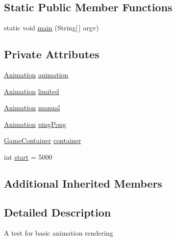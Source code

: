 \subsection*{Static Public Member Functions}
\begin{DoxyCompactItemize}
\item 
static void \mbox{\hyperlink{classorg_1_1newdawn_1_1slick_1_1tests_1_1_animation_test_a00e94fec1ac8af9337259e958e88aa74}{main}} (String\mbox{[}$\,$\mbox{]} argv)
\end{DoxyCompactItemize}
\subsection*{Private Attributes}
\begin{DoxyCompactItemize}
\item 
\mbox{\hyperlink{classorg_1_1newdawn_1_1slick_1_1_animation}{Animation}} \mbox{\hyperlink{classorg_1_1newdawn_1_1slick_1_1tests_1_1_animation_test_a1481626a35452ac4fd6b535c7a3c3afc}{animation}}
\item 
\mbox{\hyperlink{classorg_1_1newdawn_1_1slick_1_1_animation}{Animation}} \mbox{\hyperlink{classorg_1_1newdawn_1_1slick_1_1tests_1_1_animation_test_a21a680962a0736500e3a7d72caa1de4c}{limited}}
\item 
\mbox{\hyperlink{classorg_1_1newdawn_1_1slick_1_1_animation}{Animation}} \mbox{\hyperlink{classorg_1_1newdawn_1_1slick_1_1tests_1_1_animation_test_a3f8e79b4500cfad2ae6939b2fe0794b0}{manual}}
\item 
\mbox{\hyperlink{classorg_1_1newdawn_1_1slick_1_1_animation}{Animation}} \mbox{\hyperlink{classorg_1_1newdawn_1_1slick_1_1tests_1_1_animation_test_a17f3c7b2f9c7241a176dc97e14c2adbb}{ping\+Pong}}
\item 
\mbox{\hyperlink{classorg_1_1newdawn_1_1slick_1_1_game_container}{Game\+Container}} \mbox{\hyperlink{classorg_1_1newdawn_1_1slick_1_1tests_1_1_animation_test_ad2142f4fe5667df82eb8ead44f81e1b1}{container}}
\item 
int \mbox{\hyperlink{classorg_1_1newdawn_1_1slick_1_1tests_1_1_animation_test_af5b346538d97a71ad4a8a1feb69dfa2f}{start}} = 5000
\end{DoxyCompactItemize}
\subsection*{Additional Inherited Members}


\subsection{Detailed Description}
A test for basic animation rendering

